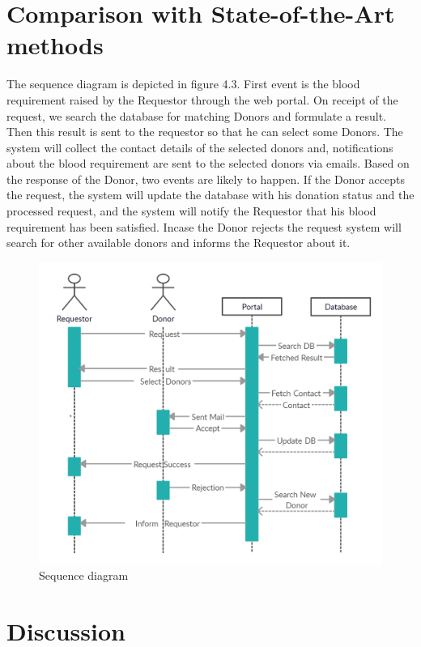 \section{Comparison with State-of-the-Art methods}

The sequence diagram is depicted in figure 4.3. First event is the blood requirement raised by the Requestor through the web portal. On receipt of the request, we search the database for matching Donors and formulate a result. Then this result is sent to the requestor so that he can select some Donors. The system will collect the contact details of the selected donors and, notifications about the blood requirement are sent to the selected donors via emails. Based on the response of the Donor, two events are likely to happen. If the Donor accepts the request, the system will update the database with his donation status and the processed request, and the system will notify the Requestor that his blood requirement has been satisfied. Incase the Donor rejects the request system will search for other available donors and informs the Requestor about it.
 
\begin{figure}
    \centering
    \includegraphics[width=\textwidth]{Sequence.jpg}
    \caption{Sequence diagram}
\end{figure}

\section{Discussion}



